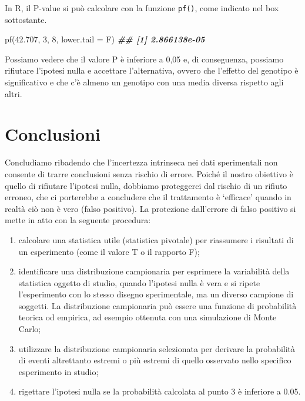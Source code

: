 \documentclass[
  12pt,
]{book}
\newenvironment{Shaded}{\begin{snugshade}}{\end{snugshade}}
\newcommand{\AttributeTok}[1]{\textcolor[rgb]{0.77,0.63,0.00}{#1}}
\newcommand{\DecValTok}[1]{\textcolor[rgb]{0.00,0.00,0.81}{#1}}
\newcommand{\DocumentationTok}[1]{\textcolor[rgb]{0.56,0.35,0.01}{\textbf{\textit{#1}}}}
\newcommand{\FloatTok}[1]{\textcolor[rgb]{0.00,0.00,0.81}{#1}}
\newcommand{\FunctionTok}[1]{\textcolor[rgb]{0.00,0.00,0.00}{#1}}
\newcommand{\NormalTok}[1]{#1}
\providecommand{\tightlist}{%
  \setlength{\itemsep}{0pt}\setlength{\parskip}{0pt}}
\begin{document}
In R, il P-value si può calcolare con la funzione \texttt{pf()}, come indicato nel box sottostante.

\vspace{12pt}

\begin{Shaded}
\begin{Highlighting}[]
\FunctionTok{pf}\NormalTok{(}\FloatTok{42.707}\NormalTok{, }\DecValTok{3}\NormalTok{, }\DecValTok{8}\NormalTok{, }\AttributeTok{lower.tail =}\NormalTok{ F)}
\DocumentationTok{\#\# [1] 2.866138e{-}05}
\end{Highlighting}
\end{Shaded}

Possiamo vedere che il valore P è inferiore a 0,05 e, di conseguenza, possiamo rifiutare l'ipotesi nulla e accettare l'alternativa, ovvero che l'effetto del genotipo è significativo e che c'è almeno un genotipo con una media diversa rispetto agli altri.

\hypertarget{conclusioni-3}{%
\section{Conclusioni}\label{conclusioni-3}}

Concludiamo ribadendo che l'incertezza intrinseca nei dati sperimentali non consente di trarre conclusioni senza rischio di errore. Poiché il nostro obiettivo è quello di rifiutare l'ipotesi nulla, dobbiamo proteggerci dal rischio di un rifiuto erroneo, che ci porterebbe a concludere che il trattamento è `efficace' quando in realtà ciò non è vero (falso positivo). La protezione dall'errore di falso positivo si mette in atto con la seguente procedura:

\begin{enumerate}
\def\labelenumi{\arabic{enumi}.}
\tightlist
\item
  calcolare una statistica utile (statistica pivotale) per riassumere i risultati di un esperimento (come il valore T o il rapporto F);
\item
  identificare una distribuzione campionaria per esprimere la variabilità della statistica oggetto di studio, quando l'ipotesi nulla è vera e si ripete l'esperimento con lo stesso disegno sperimentale, ma un diverso campione di soggetti. La distribuzione campionaria può essere una funzione di probabilità teorica od empirica, ad esempio ottenuta con una simulazione di Monte Carlo;
\item
  utilizzare la distribuzione campionaria selezionata per derivare la probabilità di eventi altrettanto estremi o più estremi di quello osservato nello specifico esperimento in studio;
\item
  rigettare l'ipotesi nulla se la probabilità calcolata al punto 3 è inferiore a 0.05.
\end{enumerate}
\end{document}
